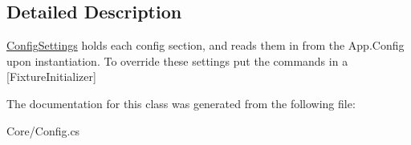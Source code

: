 \subsection{Detailed Description}
\hyperlink{class_proto_test_1_1_golem_1_1_core_1_1_config_settings}{Config\-Settings} holds each config section, and reads them in from the App.\-Config upon instantiation. To override these settings put the commands in a \mbox{[}Fixture\-Initializer\mbox{]} 



The documentation for this class was generated from the following file\-:\begin{DoxyCompactItemize}
\item 
Core/Config.\-cs\end{DoxyCompactItemize}
